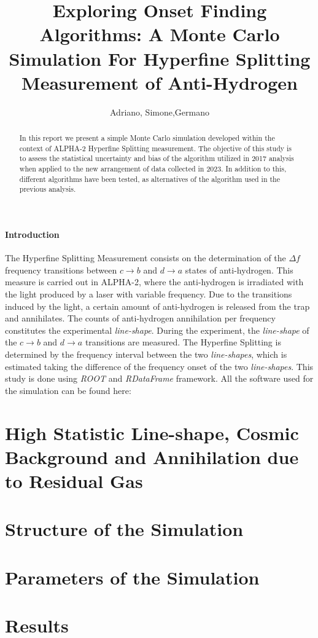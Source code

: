 \documentclass[11pt,a4paper,oneside]{article}
\title{%
 \vspace{-2.0cm}
 Exploring Onset Finding Algorithms: A Monte Carlo \\ Simulation For  Hyperfine Splitting Measurement of Anti-Hydrogen
}
\date{\vspace{-5ex}}
\author{Adriano, Simone,Germano }
\begin{document}

\maketitle
\begin{abstract}
\centering
In this report we present a simple Monte Carlo simulation developed within the context of ALPHA-2 Hyperfine Splitting measurement. The objective of this study is to assess the statistical uncertainty and bias of the algorithm utilized in 2017 analysis when applied to the new arrangement of data collected in 2023. In addition to this, different algorithms have been tested, as alternatives of the algorithm used in the previous analysis.
\end{abstract}

\paragraph{Introduction}

The Hyperfine Splitting Measurement consists on the determination of the $\Delta f$ frequency transitions between $c \rightarrow b$ and $ d \rightarrow a$ states of anti-hydrogen. This measure is carried out in ALPHA-2, where the anti-hydrogen is irradiated with the light produced by a laser with variable frequency. Due to the transitions induced by the light, a certain amount of anti-hydrogen is released from the trap and annihilates. The counts of anti-hydrogen annihilation per frequency constitutes the experimental \textit{line-shape}. During the experiment, the \textit{line-shape} of the $c \rightarrow b$ and $ d \rightarrow a$ transitions are measured. The Hyperfine Splitting is determined by the frequency interval between the two \textit{line-shapes}, which is estimated taking the difference of the frequency onset of the two \textit{line-shapes}. This study is done using \textit{ROOT} and \textit{RDataFrame} framework. All the software used for the simulation can be found here: {}

\section{High Statistic Line-shape, Cosmic Background and Annihilation due to Residual Gas}

\section{Structure of the Simulation}

\section{Parameters of the Simulation}

\section{Results}
\end{document}
